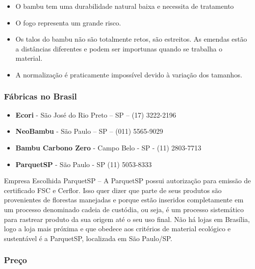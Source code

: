 	\begin{itemize}

		\item O bambu tem uma durabilidade natural baixa e necessita de tratamento

		\item O fogo representa um grande risco.

		\item Os talos do bambu não são totalmente retos, são estreitos. As emendas estão a distâncias diferentes e podem ser importunas quando se trabalha o material.

		\item A normalização é praticamente impossível devido à variação dos tamanhos.
	\end{itemize}

\subsubsection*{\textbf{Fábricas no Brasil}}

	\begin{itemize}

		\item \textbf{Ecori} -  São José do Rio Preto – SP – (17) 3222-2196

		\item \textbf{NeoBambu} - São Paulo – SP – (011) 5565-9029

		\item \textbf{Bambu Carbono Zero} - Campo Belo - SP - (11) 2803-7713

		\item \textbf{ParquetSP} - São Paulo - SP (11) 5053-8333

	\end{itemize}

	Empresa Escolhida
ParquetSP – A ParquetSP possui autorização para emissão de certificado FSC e Cerflor. Isso quer dizer que parte de seus produtos são provenientes de florestas manejadas e porque estão inseridos completamente em um processo denominado cadeia de custódia, ou seja, é um processo sistemático para rastrear produto da sua origem até o seu uso final.
Não há lojas em Brasília, logo a loja mais próxima e que obedece aos critérios de material ecológico e sustentável é a ParquetSP, localizada em São Paulo/SP.


\subsubsection*{\textbf{Preço}}

